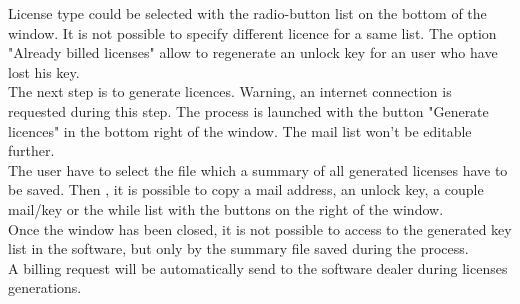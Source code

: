 License type could be selected with the radio-button list on the bottom of the window. It is not possible to specify different licence for a same list. The option "Already billed licenses" allow to regenerate an unlock key for an user who have lost his key.\\

The next step is to generate licences. Warning, an internet connection is requested during this step. The process is launched with the button "Generate licences" in the bottom right of the window. The mail list won't be editable further.\\

The user have to select the file which a summary of all generated licenses have to be saved. Then , it is possible to copy a mail address, an unlock key, a couple mail/key or the while list with the buttons on the right of the window.\\

Once the window has been closed, it is not possible to access to the generated key list in the software, but only by the summary file saved during the process.\\


A billing request will be automatically send to the software dealer during licenses generations.\\



